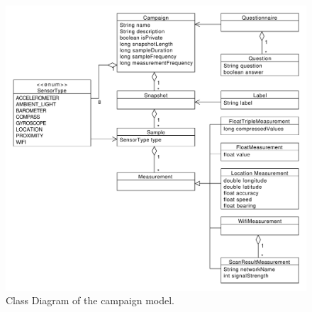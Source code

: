 
\begin{figure}[!htbp]
    \centering
    \includegraphics[width=\textwidth]{graphic/unsorted/model_class_diagram.pdf}
    \caption{Class Diagram of the campaign model.}
    \label{fig:model_class_diagram}
\end{figure}